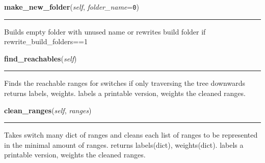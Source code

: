    \vspace{0.5ex}

\hspace{.8\funcindent}\begin{boxedminipage}{\funcwidth}

    \raggedright \textbf{make\_new\_folder}(\textit{self}, \textit{folder\_name}={\tt 0})

    \vspace{-1.5ex}

    \rule{\textwidth}{0.5\fboxrule}
\setlength{\parskip}{2ex}
    Builds empty folder with unused name or rewrites build folder if 
    rewrite\_build\_folders==1

\setlength{\parskip}{1ex}
    \end{boxedminipage}

    \label{initialize_system:No_hop_Network:network:find_reachables}

    \vspace{0.5ex}

\hspace{.8\funcindent}\begin{boxedminipage}{\funcwidth}

    \raggedright \textbf{find\_reachables}(\textit{self})

    \vspace{-1.5ex}

    \rule{\textwidth}{0.5\fboxrule}
\setlength{\parskip}{2ex}
    Finds the reachable ranges for switches if only traversing the tree 
    downwards returns labels, weights. labels a printable version, weights 
    the cleaned ranges.

\setlength{\parskip}{1ex}
    \end{boxedminipage}

    \label{initialize_system:No_hop_Network:network:clean_ranges}

    \vspace{0.5ex}

\hspace{.8\funcindent}\begin{boxedminipage}{\funcwidth}

    \raggedright \textbf{clean\_ranges}(\textit{self}, \textit{ranges})

    \vspace{-1.5ex}

    \rule{\textwidth}{0.5\fboxrule}
\setlength{\parskip}{2ex}
    Takes switch many dict of ranges and cleans each list of ranges to be 
    represented in the minimal amount of ranges. returns labels(dict), 
    weights(dict). labels a printable version, weights the cleaned ranges.

\setlength{\parskip}{1ex}
    \end{boxedminipage}

